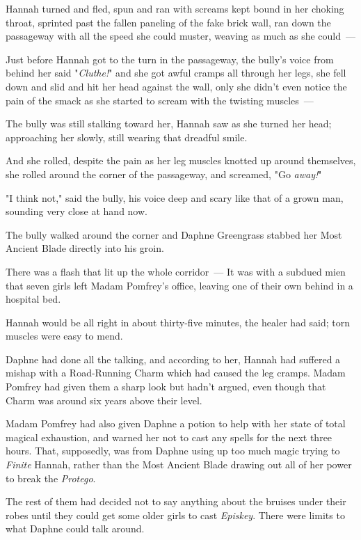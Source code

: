 Hannah turned and fled, spun and ran with screams kept bound in her choking
throat, sprinted past the fallen paneling of the fake brick wall, ran down the
passageway with all the speed she could muster, weaving as much as she could~---

Just before Hannah got to the turn in the passageway, the bully's voice from
behind her said "\emph{Cluthe!}" and she got awful cramps all through her legs,
she fell down and slid and hit her head against the wall, only she didn't even
notice the pain of the smack as she started to scream with the twisting
muscles~---

The bully was still stalking toward her, Hannah saw as she turned her head;
approaching her slowly, still wearing that dreadful smile.

And she rolled, despite the pain as her leg muscles knotted up around
themselves, she rolled around the corner of the passageway, and screamed, "Go
\emph{away!}"

"I think not," said the bully, his voice deep and scary like that of a grown
man, sounding very close at hand now.

The bully walked around the corner and Daphne Greengrass stabbed her Most
Ancient Blade directly into his groin.

There was a flash that lit up the whole corridor~---
\sbreak
It was with a subdued mien that seven girls left Madam Pomfrey's office,
leaving one of their own behind in a hospital bed.

Hannah would be all right in about thirty-five minutes, the healer had said;
torn muscles were easy to mend.

Daphne had done all the talking, and according to her, Hannah had suffered a
mishap with a Road-Running Charm which had caused the leg cramps. Madam Pomfrey
had given them a sharp look but hadn't argued, even though that Charm was
around six years above their level.

Madam Pomfrey had also given Daphne a potion to help with her state of total
magical exhaustion, and warned her not to cast any spells for the next three
hours. That, supposedly, was from Daphne using up too much magic trying to
\emph{Finite} Hannah, rather than the Most Ancient Blade drawing out all of her
power to break the \emph{Protego}.

The rest of them had decided not to say anything about the bruises under their
robes until they could get some older girls to cast \emph{Episkey}. There were
limits to what Daphne could talk around.

